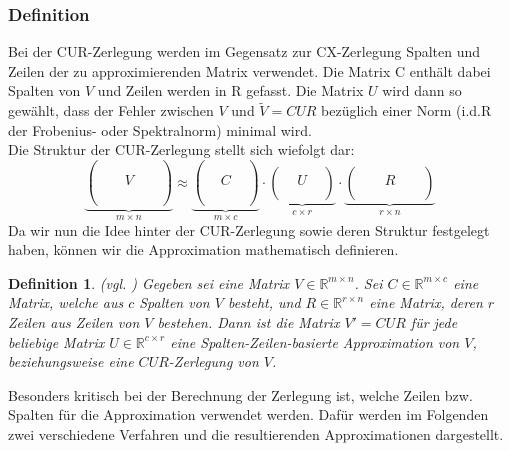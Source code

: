 \documentclass[12pt,a4paper,twoside]{article}
\newtheorem{Definition}[Satz]{Definition}
\begin{document}
		\subsubsection{Definition}
		Bei der CUR-Zerlegung werden im Gegensatz zur CX-Zerlegung Spalten und Zeilen der zu approximierenden Matrix 
		verwendet. Die Matrix C enthält dabei Spalten von $V$ und Zeilen werden in R gefasst. Die Matrix $U$ wird 
		dann so gewählt, dass der Fehler zwischen $V$ und $\tilde{V}=CUR$ bezüglich einer Norm (i.d.R der Frobenius- oder Spektralnorm) minimal wird. \\
		Die Struktur der CUR-Zerlegung stellt sich wiefolgt dar:
		\[
			\underbrace{\left(\begin{array}{ccccc}
					  &   &  & & \\ & &  & &  \\ & & V &  &   \\ & & &  &   \\ & & &  &   \\ 
					\end{array}\right)}_{m\times n}
			\approx 
			\underbrace{\left(\begin{array}{ccc}
					 &   &   \\  &   &   \\ & C &   \\ &   &   \\ &   &   \\
					\end{array}\right)}_{m\times c}\cdot 
			\underbrace{\left(\begin{array}{ccc}
					  &   &   \\ & U &   \\ &   &   \\ 
					\end{array}\right)}_{c\times r}\cdot  
			\underbrace{\left(\begin{array}{ccccc}
					  &   &  & & \\ & & R & &  \\ & & &  &   \\ 
					\end{array}\right)}_{r\times n}			
		\]
		Da wir nun die Idee hinter der CUR-Zerlegung sowie deren Struktur festgelegt haben, können wir die 
		Approximation mathematisch definieren.
		\begin{Definition}{(vgl. \citep{Drineas2009})}
			Gegeben sei eine Matrix $V\in \mathds{R}^{m\times n}$. Sei $C\in\mathds{R}^{m\times 
			c}$ eine Matrix, welche aus $c$ Spalten von $V$ besteht, und $R\in\mathds{R}^{r\times n}$ eine Matrix, 
			deren $r$ Zeilen aus Zeilen von $V$ bestehen. Dann ist die Matrix $V'=CUR$ für jede beliebige Matrix $U
			\in\mathds{R}^{c\times r}$ eine Spalten-Zeilen-basierte Approximation von $V$, beziehungsweise eine $CUR
			$-Zerlegung von $V$.
		\end{Definition}
		Besonders kritisch bei der Berechnung der Zerlegung ist, welche Zeilen bzw. Spalten für die Approximation 
		verwendet werden. Dafür werden im Folgenden zwei verschiedene Verfahren und die resultierenden 
		Approximationen dargestellt.
\end{document}
